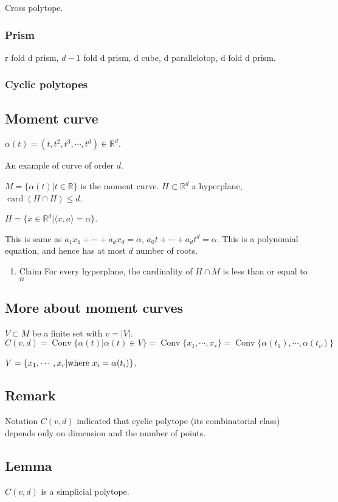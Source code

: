 \documentclass[11pt]{article}
\def\R{\mathbb{R}}
\def\conv{\operatorname{Conv}}
\begin{document}
{{Cross polytope.
\subsubsection{Prism}
\label{sec:org28c63d8}
r fold d prism, \(d-1\) fold d prism, d cube, d parallelotop, d fold d prism.
\subsubsection{Cyclic polytopes}
\label{sec:orgedc796b}
\subsection{Moment curve}
\label{sec:orge1774b3}
\(\alpha(t) = (t, t^2, t^3, \cdots, t^d) \in \R^d\).

An example of curve of order \(d\).

\(M = \{\alpha(t) \vert t \in \R\}\) is the moment curve. \(H \subset \R^d\) a
hyperplane, \(\operatorname{card}(H \cap H) \le d\).

\(H = \{x \in \R^d \vert \langle x, a \rangle = \alpha \}\).

This is same as \(a_1 x_1 + \cdots + a_d x_d = \alpha\), \(a_0t + \cdots + a_d
   t^d = \alpha\). This is a polynomial equation, and hence has at most \(d\)
number of roots.

\begin{enumerate}
\item Claim
\label{sec:org960c90b}
For every hyperplane, the cardinality of \(H \cap M\) is less than or equal to \(n\)
\end{enumerate}
\subsection{More about moment curves}
\label{sec:org34bb40f}
\(V \subset M\) be a finite set with \(v = \vert V \vert\). \(C(v, d) =
   \conv\{\alpha(t) \vert \alpha(t) \in V\} = \conv\{x_1, \cdots, x_r\} =
   \conv\{\alpha(t_1), \cdots, \alpha(t_v)\}\)

\(V = \{x_1, \cdots, x_r \vert \textup{where } x_i = \alpha(t_i)\}\).
\subsection{Remark}
\label{sec:org7d75bbd}
Notation \(C(v, d)\) indicated that cyclic polytope (its combinatorial class)
depends only on dimension and the number of points.
\subsection{Lemma}
\label{sec:org622cff8}
\(C(v, d)\) is a simplicial polytope.
}}
\end{document}

